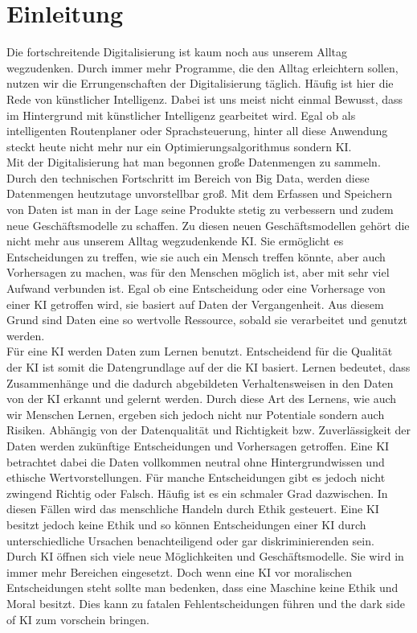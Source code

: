 \chapter{Einleitung}
    \begin{onehalfspace}    
        \label{sec:einleitung}
            Die fortschreitende Digitalisierung ist kaum noch aus unserem Alltag wegzudenken. Durch immer mehr Programme, die den Alltag erleichtern sollen, nutzen wir die Errungenschaften der Digitalisierung täglich. Häufig ist hier die Rede von künstlicher Intelligenz. Dabei ist uns meist nicht einmal Bewusst, dass im Hintergrund mit künstlicher Intelligenz gearbeitet wird. Egal ob als intelligenten Routenplaner oder Sprachsteuerung, hinter all diese Anwendung steckt heute nicht mehr nur ein Optimierungsalgorithmus sondern \ac{KI}. 
            \\
            Mit der Digitalisierung hat man begonnen große Datenmengen zu sammeln. Durch den technischen Fortschritt im Bereich von Big Data, werden diese Datenmengen heutzutage unvorstellbar groß. Mit dem Erfassen und Speichern von Daten ist man in der Lage seine Produkte stetig zu verbessern und zudem neue Geschäftsmodelle zu schaffen. Zu diesen neuen Geschäftsmodellen gehört die nicht mehr aus unserem Alltag wegzudenkende \ac{KI}. Sie ermöglicht es Entscheidungen zu treffen, wie sie auch ein Mensch treffen könnte, aber auch Vorhersagen zu machen, was für den Menschen möglich ist, aber mit sehr viel Aufwand verbunden ist. Egal ob eine Entscheidung oder eine Vorhersage von einer \ac{KI} getroffen wird, sie basiert auf Daten der Vergangenheit. Aus diesem Grund sind Daten eine so wertvolle Ressource, sobald sie verarbeitet und genutzt werden. 
            \\
            Für eine \ac*{KI} werden Daten zum Lernen benutzt. Entscheidend für die Qualität der \ac*{KI} ist somit die Datengrundlage auf der die \ac*{KI} basiert. Lernen bedeutet, dass Zusammenhänge und die dadurch abgebildeten Verhaltensweisen in den Daten von der \ac*{KI} erkannt und gelernt werden. Durch diese Art des Lernens, wie auch wir Menschen Lernen, ergeben sich jedoch nicht nur Potentiale sondern auch Risiken. Abhängig von der Datenqualität und Richtigkeit bzw. Zuverlässigkeit der Daten werden zukünftige Entscheidungen und Vorhersagen getroffen. Eine \ac*{KI} betrachtet dabei die Daten vollkommen neutral ohne Hintergrundwissen und ethische Wertvorstellungen. Für manche Entscheidungen gibt es jedoch nicht zwingend Richtig oder Falsch. Häufig ist es ein schmaler Grad dazwischen. In diesen Fällen wird das menschliche Handeln durch Ethik gesteuert. Eine \ac*{KI} besitzt jedoch keine Ethik und so können Entscheidungen einer KI durch unterschiedliche Ursachen benachteiligend oder gar diskriminierenden sein.
            \\
            Durch \ac*{KI} öffnen sich viele neue Möglichkeiten und Geschäftsmodelle. Sie wird in immer mehr Bereichen eingesetzt. Doch wenn eine \ac*{KI} vor moralischen Entscheidungen steht sollte man bedenken, dass eine Maschine keine Ethik und Moral besitzt. Dies kann zu fatalen Fehlentscheidungen führen und \glqq{}the dark side of \ac*{KI}\grqq{} zum vorschein bringen.


\end{onehalfspace}
